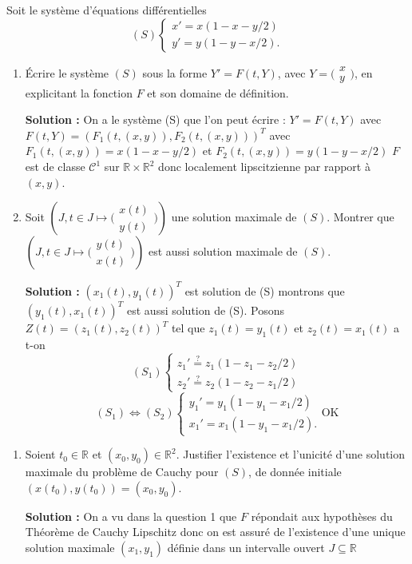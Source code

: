\documentclass[12pt,a4paper]{article}
\newcommand{\R}{\mathbb{R}}
\newcommand{\solution}[1]{\par\noindent\textbf{\color{OliveGreen}Solution :} \textcolor{OliveGreen}{#1}}
\begin{document}
\begin{exo}
  Soit le système d'équations différentielles
  $$
  (S)\begin{cases}
    x'=x(1-x-y/2)\\
    y'=y(1-y-x/2).
  \end{cases}
  $$
  \begin{enumerate}
    \item 
      Écrire le système $(S)$ sous la forme $Y'=F(t,Y)$, avec $Y=\Big(\begin{array}{c}x\\y\end{array}\Big)$, en explicitant la fonction $F$ et son domaine de définition.
	      \solution{On a le système (S) que l'on peut écrire : $Y' = F(t,Y)$ avec $F(t,Y) = (F_1(t,(x,y)),F_2(t,(x,y)))^T$ avec $F_1(t,(x,y)) = x(1-x-y/2)$ et $F_2(t,(x,y)) = y(1-y-x/2)$ $F$ est de classe $\mathcal{C}^1$ sur $\R\times\R^2$ donc localement lipscitzienne par rapport à $(x,y)$.}
  \item Soit $\left(J,t\in J\mapsto \Big(\begin{array}{c}x(t)\\y(t)\end{array}\Big)\right)$ une solution maximale de $(S)$. Montrer que $\left(J,t\in J\mapsto\Big(\begin{array}{c}y(t)\\x(t)\end{array}\Big)\right)$ est aussi solution maximale de $(S)$.
		  \solution{$(x_1(t),y_1(t))^T$ est solution de (S) montrons que $(y_1(t),x_1(t))^T$ est aussi solution de (S). Posons $Z(t) = (z_1(t),z_2(t))^T$ tel que $z_1(t) = y_1(t)$ et $z_2(t) = x_1(t)$ a t-on 
  $$
		  (S_1)\begin{cases}
    z_1' \stackrel{?}{=} z_1(1-z_1-z_2/2)\\
    z_2' \stackrel{?}{=} z_2(1-z_2-z_1/2)
  \end{cases}
  $$
  $$
		  (S_1)\iff (S_2) \begin{cases}
    y_1' = y_1(1-y_1-x_1/2)\\
    x_1' = x_1(1-y_1-x_1/2).
		  \end{cases} \text{OK}
  $$
}
  \end{enumerate}
  \begin{enumerate}
    \item Soient $t_0\in\R$ et $(x_0,y_0)\in\R^2$. Justifier l'existence et l'unicité d'une solution maximale du problème de Cauchy pour $(S)$, de donnée initiale $(x(t_0),y(t_0))=(x_0,y_0)$.
	    \solution{On a vu dans la question 1 que $F$ répondait aux hypothèses du Théorème de Cauchy Lipschitz donc on est assuré de l'existence d'une unique solution maximale $(x_1,y_1)$ définie dans un intervalle ouvert $J \subseteq \R$}
		  

\end{enumerate}
\end{exo}
\end{document}
